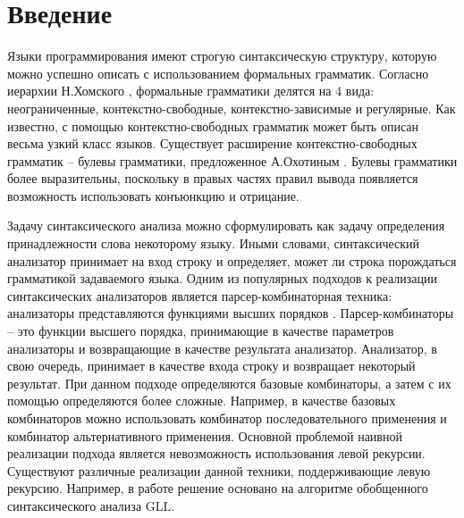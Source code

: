 \documentclass[14pt]{matmex-diploma}
\begin{document}
\maketitle
\tableofcontents

\section*{Введение} 
Языки программирования имеют строгую синтаксическую структуру, которую можно успешно описать с использованием формальных грамматик. Согласно иерархии Н.Хомского \cite{chomsky1956three}, формальные грамматики делятся на 4 вида:  неограниченные, контекстно-свободные, контекстно-зависимые и регулярные. Как известно, с помощью контекстно-свободных грамматик может быть описан весьма узкий класс языков. Существует расширение контекстно-свободных грамматик -- булевы грамматики, предложенное А.Охотиным \cite{okhotin2004boolean}. Булевы грамматики более выразительны, поскольку в правых частях правил вывода появляется возможность использовать конъюнкцию и отрицание.


Задачу синтаксического анализа можно сформулировать как задачу определения принадлежности слова некоторому языку. Иными словами, синтаксический анализатор принимает на вход строку и определяет, может ли строка порождаться грамматикой задаваемого языка. Одним из популярных подходов к реализации синтаксических анализаторов является парсер-комбинаторная техника: анализаторы представляются функциями высших порядков \cite{hutton1996monadic}. Парсер-комбинаторы -- это функции высшего порядка, принимающие в качестве параметров анализаторы и возвращающие в качестве результата анализатор. Анализатор, в свою очередь, принимает в качестве входа строку и возвращает некоторый результат. При данном подходе определяются базовые комбинаторы, а затем с их помощью определяются более сложные. Например, в качестве базовых комбинаторов можно использовать комбинатор последовательного применения и комбинатор альтернативного применения. 
Основной проблемой наивной реализации подхода является невозможность использования левой рекурсии. Существуют различные реализации данной техники, поддерживающие левую рекурсию. Например, в работе \cite{spiewak2010generalized} решение основано на алгоритме обобщенного синтаксического анализа GLL.
\end{document}
